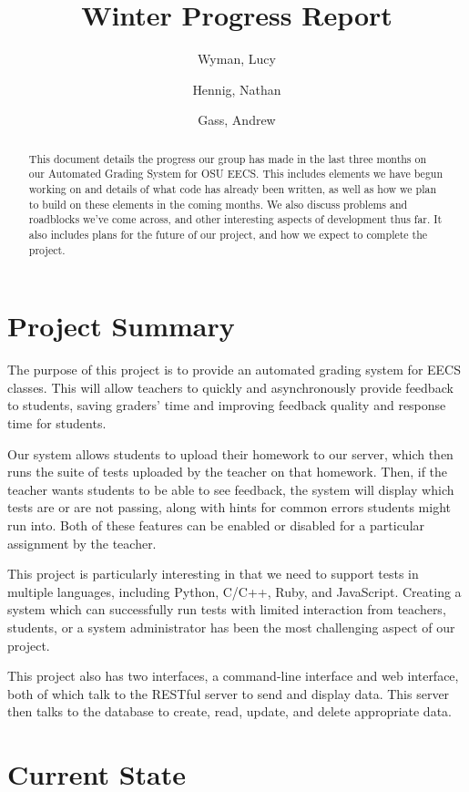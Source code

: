 \documentclass[10pt,draftclsnofoot,onecolumn]{IEEEtran}
\title{Winter Progress Report}
\author{Wyman, Lucy
\and Hennig, Nathan
\and Gass, Andrew}
\begin{document}
\maketitle
\begin{abstract} 
This document details the progress our group has made in the
last three months on our Automated Grading System for OSU EECS.  This includes
elements we have begun working on and details of what code has already been
written, as well as how we plan to build on these elements in the coming
months.  We also discuss problems and roadblocks we’ve come across, and other
interesting aspects of development thus far. It also includes plans for the
future of our project, and how we expect to complete the project.
\end{abstract}
\newpage
\section{Project Summary}
The purpose of this project is to provide an automated grading system for EECS
classes. This will allow teachers to quickly and asynchronously provide
feedback to students, saving graders’ time and improving feedback quality and
response time for students. 

Our system allows students to upload their homework to our server, which then
runs the suite of tests uploaded by the teacher on that homework.  Then, if the
teacher wants students to be able to see feedback, the system will display
which tests are or are not passing, along with hints for common errors students
might run into. Both of these features can be enabled or disabled for a
particular assignment by the teacher.

This project is particularly interesting in that we need to support tests in
multiple languages, including Python, C/C++, Ruby, and JavaScript.  Creating a
system which can successfully run tests with limited interaction from teachers,
students, or a system administrator has been the most challenging aspect of our
project.

This project also has two interfaces, a command-line interface and web
interface, both of which talk to the RESTful server to send and display data.
This server then talks to the database to create, read, update, and delete
appropriate data.

\section{Current State}
\end{document}
